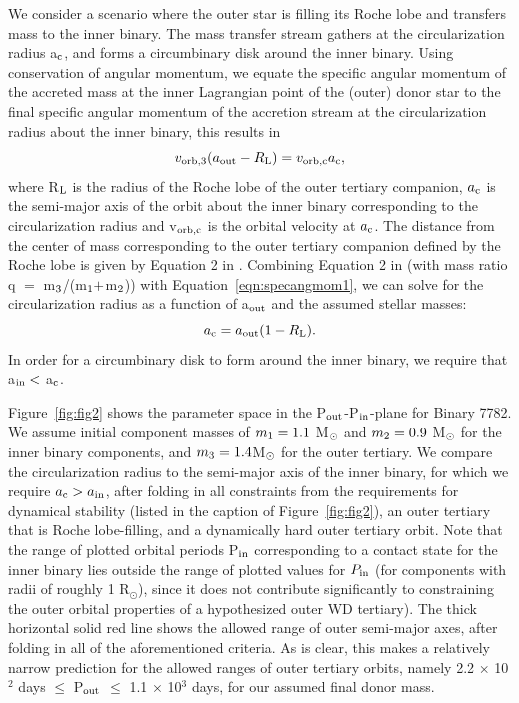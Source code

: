 \documentclass{aastex62}
\begin{document}
{We consider a scenario where the outer star is filling its Roche lobe
and transfers mass to the inner binary.  The mass transfer stream
gathers at the circularization radius a$_{\rm c}$, and forms a circumbinary disk
around the inner binary.  Using conservation of angular momentum, we
equate the specific angular momentum of the accreted mass at the inner
Lagrangian point of the (outer) donor star to the final specific
angular momentum of the accretion stream at the circularization radius
about the inner binary, this results in
\begin{equation}
\label{eqn:specangmom1}
v_{\rm orb,3}(a_{\rm out} - R_{\rm L}) = v_{\rm orb,c}a_{\rm c},
\end{equation}
where R$_{\rm L}$ is the radius of the Roche lobe of the outer
tertiary companion, $a_{\rm c}$ is the semi-major axis of the orbit
about the inner binary corresponding to the circularization radius and
v$_{\rm orb,c}$ is the orbital velocity at $a_{\rm c}$.  The distance
from the center of mass corresponding to the outer tertiary companion
defined by the Roche lobe is given by Equation 2 in
\citep{1983ApJ...268..368E}.  Combining Equation 2 in \citet{1983ApJ...268..368E} (with
mass ratio q $=$ m$_{\rm 3}$/(m$_{\rm 1} +$m$_{\rm 2}$)) with
Equation~\ref{eqn:specangmom1}, we can solve for the circularization
radius as a function of a$_{\rm out}$ and the assumed stellar masses:
\begin{equation}
\label{eqn:ac}
a_{\rm c} = a_{\rm out}(1 - R_{\rm L}).
\end{equation}
In order for a circumbinary disk to form around the inner binary, we
require that a$_{\rm in} <$ a$_{\rm c}$.

Figure~\ref{fig:fig2} shows the parameter space in the P$_{\rm
  out}$-P$_{\rm in}$-plane for Binary 7782.  We assume initial
component masses of $m_{\rm 1} = 1.1$ M$_{\rm \odot}$ and $m_{\rm 2}
= 0.9$ M$_{\rm \odot}$ for the inner binary components, and $m_{\rm 3}
= 1.4 $M$_{\rm \odot}$ for the outer tertiary.  We compare the
circularization radius to the semi-major axis of the inner binary, for
which we require $a_{\rm c} > a_{\rm in}$, after folding in all
constraints from the requirements for dynamical stability (listed in
the caption of Figure~\ref{fig:fig2}), an outer tertiary that is Roche
lobe-filling, and a dynamically hard outer tertiary orbit.  Note that
the range of plotted orbital periods P$_{\rm in}$ corresponding to a
contact state for the inner binary lies outside the range of plotted
values for $P_{\rm in}$ (for components with radii of roughly 1
R$_{\odot}$), since it does not contribute significantly to
constraining the outer orbital properties of a hypothesized outer WD
tertiary).  The thick horizontal solid red line shows the allowed range
of outer semi-major axes, after folding in all of the aforementioned
criteria.  As is clear, this makes a relatively narrow prediction for
the allowed ranges of outer tertiary orbits, namely 2.2 $\times$
10$^{2}$ days $\le$ P$_{\rm out}$ $\le$ 1.1 $\times$ 10$^3$ days, for
our assumed final donor mass.

}
\end{document}
